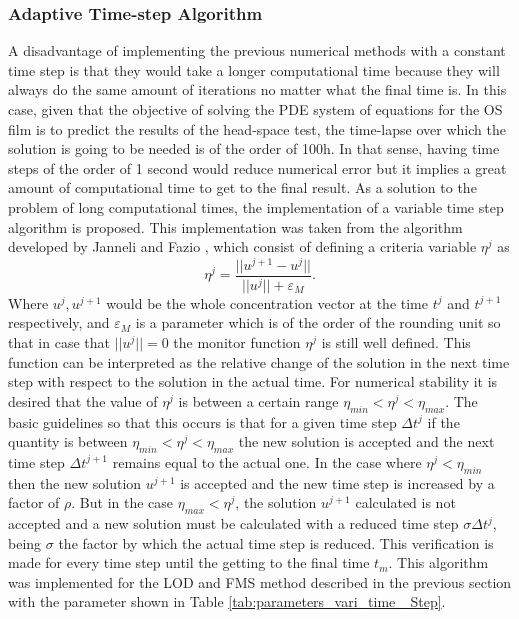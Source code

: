 \begin{refsection}
\subsubsection{Adaptive Time-step Algorithm}
A disadvantage of implementing the previous numerical methods with a constant time step is that they would take a longer computational time because they will always do the same amount of iterations no matter what the final time is. In this case, given that the objective of solving the PDE system of equations for the OS film is to predict the results of the head-space test, the time-lapse over which the solution is going to be needed is of the order of 100h. In that sense, having time steps of the order of 1 second would reduce numerical error but it implies a great amount of computational time to get to the final result. As a solution to the problem of long computational times, the implementation of a variable time step algorithm is proposed. This implementation was taken from the algorithm developed by Janneli and Fazio \cite{Jannelli2006AdaptiveComplexity}, which consist of defining a criteria variable $\eta^j$ as
\begin{equation}
    \eta^j= \frac{||u^{j+1}-u^{j}||}{||u^{j}||+\varepsilon_M}.
\end{equation}
Where $u^j,u^{j+1} $ would be the whole concentration vector at the time $t^j$ and $t^{j+1}$ respectively, and $\varepsilon_M$ is a parameter which is of the order of the rounding unit so that in case that $||u^{j}||=0$ the monitor function $\eta^j$ is still well defined. This function can be interpreted as the relative change of the solution in the next time step with respect to the solution in the actual time. For numerical stability  it is desired that the value of $\eta^j$ is between a certain range $ \eta_{min}<\eta^j <\eta_{max}$. The basic guidelines so that this occurs is that for a given time step $\Delta t^j$ if the quantity is between $ \eta_{min}<\eta^j <\eta_{max}$ the new solution is accepted and the next time step $\Delta t^{j+1}$ remains equal to the actual one. In the case where $\eta^j<\eta_{min}$ then the new solution $u^{j+1}$ is accepted and the new time step is increased by a factor of $\rho$. But in the case $ \eta_{max}<\eta^j$, the solution $u^{j+1}$ calculated is not accepted and a new solution must be calculated with a reduced time step $\sigma \Delta t^j$, being $\sigma$ the factor by which the actual time step is reduced. This verification is made for every time step until the getting to the final time $t_m$. This algorithm was implemented for the LOD and FMS method described in the previous section with the parameter shown in Table \ref{tab:parameters_vari_time _Step}.



\end{refsection}
